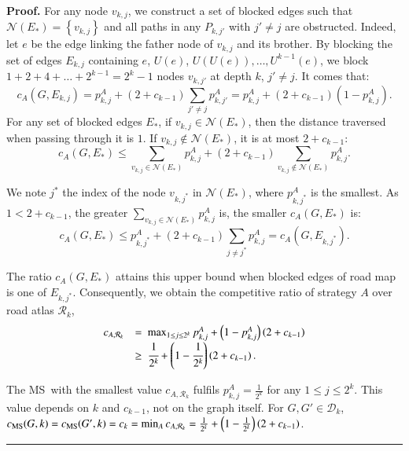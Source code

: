 \documentclass[preprint]{elsarticle}
\newenvironment{proof}[1][Proof]{\textbf{#1.} }{\ \rule{0.5em}{0.5em}}
\newcommand{\set}[1]{\left\{ #1 \right\}}
\newcommand{\mcalr}{\mathcal{R}}
\newcommand{\mcald}{\mathcal{D}}
\newcommand{\mcaln}{\mathcal{N}}
\newcommand{\mts}{MS}
\newcommand{\cms}{c_{\mbox{\scriptsize{MS}}}}
\begin{document}
\begin{proof}
For any node $v_{k,j}$, we construct a set of blocked edges such that $\mcaln(E_*) = \set{v_{k,j}}$ and all paths in any $P_{k,j'}$ with $j' \neq j$ are obstructed. Indeed, let $e$ be the edge linking the father node of $v_{k,j}$ and its brother. By blocking the set of edges $E_{k,j}$ containing $e$,  $U(e)$, $U(U(e)),\ldots, U^{k-1}(e)$, we block $1+2+4+\ldots+2^{k-1} = 2^k - 1$ nodes $v_{k,j'}$ at depth $k$, $j' \neq j$. 
It comes that:
\[
c_A(G, E_{k,j}) = p_{k,j}^A + (2+c_{k-1})\sum_{j' \neq j}p_{k,j'}^A = p_{k,j}^A + (2+c_{k-1})(1-p_{k,j}^A).
\]
For any set of blocked edges $E_*$, if $v_{k,j} \in \mcaln(E_*)$, then the distance traversed when passing through it is $1$. If $v_{k,j} \notin \mcaln(E_*)$, it is at most $2 + c_{k-1}$:
\[
c_A(G, E_*) \leq \sum_{v_{k,j}\in \mcaln(E_*)} p_{k,j}^A+  (2+c_{k-1})\sum_{v_{k,j}\notin \mcaln(E_*)}p_{k,j}^A.
\]

We note $j^*$ the index of the node $v_{k,j^*}$ in $\mcaln\left(E_*\right)$, where $p_{k,j^*}^A$ is the smallest. As $1 < 2 + c_{k-1}$, the greater $\sum_{v_{k,j}\in \mcaln(E_*)} p_{k,j}^A$ is, the smaller $c_A(G, E_*)$ is:
\[
c_A(G, E_*) \le p_{k,j^*}^A + (2+c_{k-1})\sum_{j\neq j^*}p_{k,j}^A = c_A(G, E_{k,j^*}).
\] 

The ratio $c_A(G, E_*)$ attains this upper bound when blocked edges of road map is one of $E_{k,j^*}$. Consequently, we obtain the competitive ratio of strategy $A$ over road atlas $\mcalr_k$,
\[
\begin{array}{rl}
c_{A,\mcalr_k} & =  ~\max_{1 \le j \le 2^k} p_{k,j}^{A} + \left(1-p_{k,j}^{A}\right)\left(2+c_{k-1}\right)\\
& \geq ~\cfrac{1}{2^k} + \left(1-\cfrac{1}{2^k}\right)\left(2+c_{k-1}\right).
\end{array}
\]

The \mts ~with the smallest value $c_{A,\mcalr_k}$ fulfils $p_{k,j}^A = \frac{1}{2^k}$ for any $1 \le j \le 2^k$. This value depends on $k$ and $c_{k-1}$, not on the graph itself. For $G,G' \in \mcald_k$, $\cms(G,k) = \cms(G',k) = c_k = \min_{A} c_{A,\mcalr_k} = \frac{1}{2^k} + \left(1-\frac{1}{2^k}\right)\left(2+c_{k-1}\right)$.
\end{proof}
\end{document}
